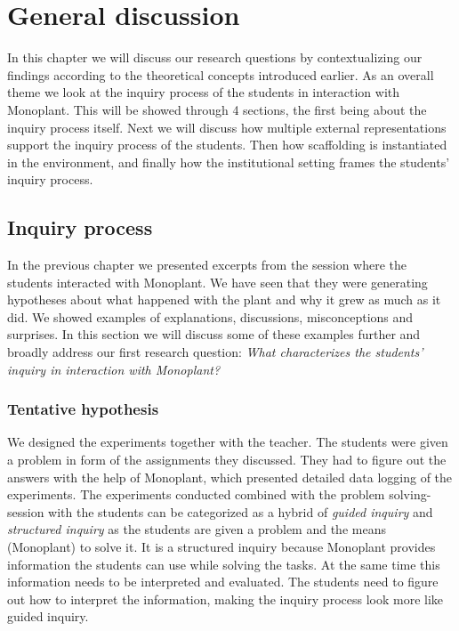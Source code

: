 \chapter{General discussion}
In this chapter we will discuss our research questions by contextualizing our findings according to the theoretical concepts introduced earlier. As an overall theme we look at the inquiry process of the students in interaction with Monoplant. This will be showed through 4 sections, the first being about the inquiry process itself. Next we will discuss how multiple external representations support the inquiry process of the students. Then how scaffolding is instantiated in the environment, and finally how the institutional setting frames the students' inquiry process.


\section{Inquiry process}
In the previous chapter we presented excerpts from the session where the students interacted with Monoplant. We have seen that they were generating hypotheses about what happened with the plant and why it grew as much as it did. We showed examples of explanations, discussions, misconceptions and surprises. In this section we will discuss some of these examples further and broadly address our first research question: \emph{What characterizes the students' inquiry in interaction with Monoplant?}

\subsection{Tentative hypothesis}
We designed the experiments together with the teacher. The students were given a problem in form of the assignments they discussed. They had to figure out the answers with the help of Monoplant, which presented detailed data logging of the experiments. The experiments conducted combined with the problem solving-session with the students can be categorized as a hybrid of \emph{guided inquiry} and \emph{structured inquiry} \citetext{\citealp{staver1987analysis}, referenced in \citealp{prince2006inductive}} as the students are given a problem and the means (Monoplant) to solve it. It is a structured inquiry because Monoplant provides information the students can use while solving the tasks. At the same time this information needs to be interpreted and evaluated. The students need to figure out how to interpret the information, making the inquiry process look more like guided inquiry.

